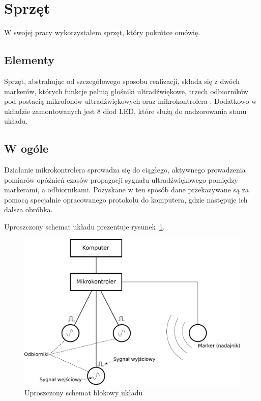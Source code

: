 \label{ch:solution} %

\section{Sprzęt}
W swojej pracy wykorzystałem sprzęt, który pokrótce omówię.

\subsection{Elementy}
Sprzęt, abstrahując od szczegółowego sposobu realizacji, składa się z dwóch markerów, których funkcje pełnią głośniki ultradźwiękowe, trzech odbiorników pod postacią mikrofonów ultradźwiękowych oraz mikrokontrolera . Dodatkowo w układzie zamontowanych jest 8 diod LED, które służą do nadzorowania stanu układu.

\subsection{W ogóle}
Działanie mikrokontrolera sprowadza się do ciągłego, aktywnego prowadzenia pomiarów opóźnień czasów propagacji sygnału ultradźwiękowego pomiędzy markerami, a odbiornikami. Pozyskane w ten sposób dane przekazywane są za pomocą specjalnie opracowanego protokołu do komputera, gdzie następuje ich dalsza obróbka.

Uproszczony schemat układu prezentuje rysunek~\ref{fig:device_scheme}.

\begin{figure}
 \includegraphics[width=\textwidth]{gfx/diagramy/schemat_blokowy_ukladu}
 \caption{Uproszczony schemat blokowy układu}
 \label{fig:device_scheme}
\end{figure}

